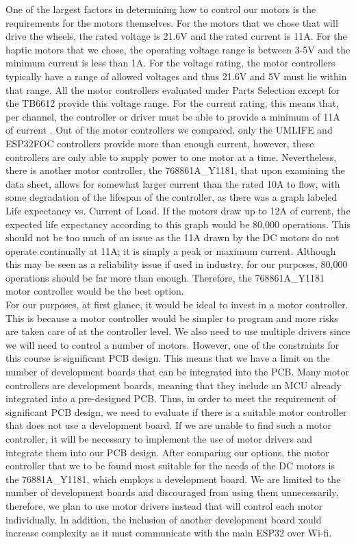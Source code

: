 \noindent One of the largest factors in determining how to control our motors is the requirements for the motors themselves. For the motors that we chose that will drive the wheels, the rated voltage is 21.6V and the rated current is 11A. For the haptic motors that we chose, the operating voltage range is between 3-5V and the minimum current is less than 1A. For the voltage rating, the motor controllers typically have a range of allowed voltages and thus 21.6V and 5V must lie within that range. All the motor controllers evaluated under Parts Selection except for the TB6612 provide this voltage range. For the current rating, this means that, per channel, the controller or driver must be able to provide a minimum of 11A of current \cite{AliExpress6} \cite{StackExchange} \cite{ArduinoForum}. Out of the motor controllers we compared, only the UMLIFE and ESP32FOC controllers provide more than enough current, however, these controllers are only able to supply power to one motor at a time. Nevertheless, there is another motor controller, the 768861A\_Y1181, that upon examining the data sheet, allows for somewhat larger current than the rated 10A to flow, with some degradation of the lifespan of the controller, as there was a graph labeled Life expectancy vs. Current of Load. If the motors draw up to 12A of current, the expected life expectancy according to this graph would be 80,000 operations. This should not be too much of an issue as the 11A drawn by the DC motors do not operate continually at 11A; it is simply a peak or maximum current. Although this may be seen as a reliability issue if used in industry, for our purposes, 80,000 operations should be far more than enough. Therefore, the 768861A\_Y1181 motor controller would be the best option. \\

\noindent For our purposes, at first glance, it would be ideal to invest in a motor controller. This is because a motor controller would be simpler to program and more risks are taken care of at the controller level. We also need to use multiple drivers since we will need to control a number of motors. However, one of the constraints for this course is significant PCB design. This means that we have a limit on the number of development boards that can be integrated into the PCB. Many motor controllers are development boards, meaning that they include an MCU already integrated into a pre-designed PCB. Thus, in order to meet the requirement of significant PCB design, we need to evaluate if there is a suitable motor controller that does not use a development board. If we are unable to find such a motor controller, it will be necessary to implement the use of motor drivers and integrate them into our PCB design. After comparing our options, the motor controller that we to be found most suitable for the needs of the DC motors is the 76881A\_Y1181, which employs a development board. We are limited to the number of development boards and discouraged from using them unnecessarily, therefore, we plan to use motor drivers instead that will control each motor individually. In addition, the inclusion of another development board xould increase complexity as it must communicate with the main ESP32 over Wi-fi. \\

